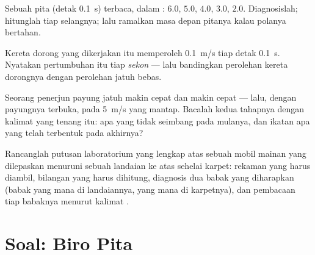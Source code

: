 \begin{exercise}[$\star\star$]\label{exo:g9:uniform-varied-motion:9}
Sebuah pita (detak \qty{0.1}{s}) terbaca, dalam : $6.0$,
$5.0$, $4.0$, $3.0$, $2.0$. Diagnosislah; hitunglah tiap 
selangnya; lalu ramalkan masa depan pitanya kalau polanya bertahan.
\end{exercise}

\begin{exercise}[$\star\star$]\label{exo:g9:uniform-varied-motion:10}
Kereta dorong yang dikerjakan itu memperoleh \qty{0.1}{m/s} tiap detak
\qty{0.1}{s}. Nyatakan pertumbuhan itu tiap \emph{sekon} --- lalu
bandingkan perolehan kereta dorongnya dengan perolehan jatuh bebas.
\end{exercise}

\begin{exercise}[$\star\star$]\label{exo:g9:uniform-varied-motion:11}
Seorang penerjun payung jatuh makin cepat dan makin cepat --- lalu,
dengan payungnya terbuka, pada \qty{5}{m/s} yang mantap. Bacalah kedua
tahapnya dengan kalimat yang tenang itu: apa yang tidak seimbang pada
mulanya, dan ikatan apa yang telah terbentuk pada akhirnya?
\end{exercise}

\begin{exercise}[$\star\star\star$]\label{exo:g9:uniform-varied-motion:12}
Rancanglah putusan laboratorium yang lengkap atas sebuah mobil mainan
yang dilepaskan menuruni sebuah landaian ke atas sehelai karpet:
rekaman yang harus diambil, bilangan yang harus dihitung, diagnosis dua
babak yang diharapkan (babak yang mana di landaiannya, yang mana di
karpetnya), dan pembacaan tiap babaknya menurut kalimat .
\end{exercise}

\section{Soal: Biro Pita}

